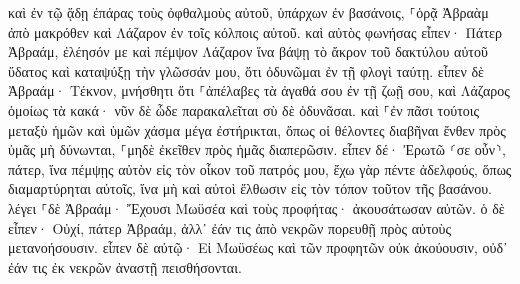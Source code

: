 \documentclass[twoside, 9pt]{extreport}
\begin{document}
καὶ ἐν τῷ ᾅδῃ ἐπάρας τοὺς ὀφθαλμοὺς αὐτοῦ, ὑπάρχων ἐν βασάνοις, ⸀ὁρᾷ Ἀβραὰμ ἀπὸ μακρόθεν καὶ Λάζαρον ἐν τοῖς κόλποις αὐτοῦ. 
καὶ αὐτὸς φωνήσας εἶπεν· Πάτερ Ἀβραάμ, ἐλέησόν με καὶ πέμψον Λάζαρον ἵνα βάψῃ τὸ ἄκρον τοῦ δακτύλου αὐτοῦ ὕδατος καὶ καταψύξῃ τὴν γλῶσσάν μου, ὅτι ὀδυνῶμαι ἐν τῇ φλογὶ ταύτῃ. 
εἶπεν δὲ Ἀβραάμ· Τέκνον, μνήσθητι ὅτι ⸀ἀπέλαβες τὰ ἀγαθά σου ἐν τῇ ζωῇ σου, καὶ Λάζαρος ὁμοίως τὰ κακά· νῦν δὲ ὧδε παρακαλεῖται σὺ δὲ ὀδυνᾶσαι. 
καὶ ⸀ἐν πᾶσι τούτοις μεταξὺ ἡμῶν καὶ ὑμῶν χάσμα μέγα ἐστήρικται, ὅπως οἱ θέλοντες διαβῆναι ἔνθεν πρὸς ὑμᾶς μὴ δύνωνται, ⸀μηδὲ ἐκεῖθεν πρὸς ἡμᾶς διαπερῶσιν. 
εἶπεν δέ· Ἐρωτῶ ⸂σε οὖν⸃, πάτερ, ἵνα πέμψῃς αὐτὸν εἰς τὸν οἶκον τοῦ πατρός μου, 
ἔχω γὰρ πέντε ἀδελφούς, ὅπως διαμαρτύρηται αὐτοῖς, ἵνα μὴ καὶ αὐτοὶ ἔλθωσιν εἰς τὸν τόπον τοῦτον τῆς βασάνου. 
λέγει ⸀δὲ Ἀβραάμ· Ἔχουσι Μωϋσέα καὶ τοὺς προφήτας· ἀκουσάτωσαν αὐτῶν. 
ὁ δὲ εἶπεν· Οὐχί, πάτερ Ἀβραάμ, ἀλλ᾽ ἐάν τις ἀπὸ νεκρῶν πορευθῇ πρὸς αὐτοὺς μετανοήσουσιν. 
εἶπεν δὲ αὐτῷ· Εἰ Μωϋσέως καὶ τῶν προφητῶν οὐκ ἀκούουσιν, οὐδ᾽ ἐάν τις ἐκ νεκρῶν ἀναστῇ πεισθήσονται. 
\end{document}

